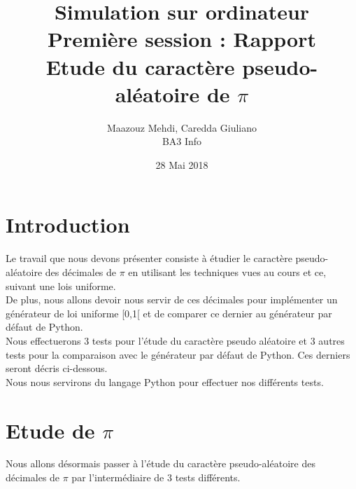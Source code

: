 \documentclass[french]{article}
\title{Simulation sur ordinateur \\ Première session : Rapport \\ Etude du caractère pseudo-aléatoire de $\pi$}
\author{Maazouz Mehdi, Caredda Giuliano \\ BA3 Info}
\date{28 Mai 2018}
\begin{document}
\maketitle
\newpage
\renewcommand{\contentsname}{Sommaire}
\tableofcontents
\newpage

\section{Introduction}
Le travail que nous devons présenter consiste à étudier le caractère pseudo-aléatoire des décimales de $\pi$
en utilisant les techniques vues au cours et ce, suivant une lois uniforme. \\
De plus, nous allons devoir nous servir de ces décimales pour implémenter un générateur de loi uniforme [0,1[ 
et de comparer ce dernier au générateur par défaut de Python. \\
Nous effectuerons 3 tests pour l'étude du caractère pseudo aléatoire et 3 autres tests pour la comparaison avec le générateur par défaut de Python. Ces derniers seront décris ci-dessous. \\
Nous nous servirons du langage Python pour effectuer nos différents tests.

\section{Etude de $\pi$ }
Nous allons désormais passer à l'étude du caractère pseudo-aléatoire des décimales de $\pi$
par l'intermédiaire de 3 tests différents.
\end{document}
